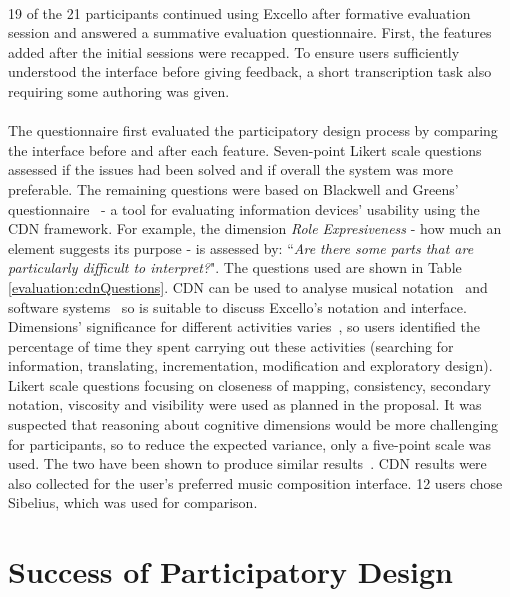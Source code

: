 \paragraph{} 19 of the 21 participants continued using Excello after formative evaluation session and answered a summative evaluation questionnaire. First, the features added after the initial sessions were recapped. To ensure users sufficiently understood the interface before giving feedback, a short transcription task also requiring some authoring was given.

\paragraph{} The questionnaire first evaluated the participatory design process by comparing the interface before and after each feature. Seven-point Likert scale questions assessed if the issues had been solved and if overall the system was more preferable. The remaining questions were based on Blackwell and Greens' questionnaire~\cite{blackwell:questionnaire} - a tool for evaluating information devices' usability using the
CDN framework. For example, the dimension \textit{Role Expresiveness} - how much an element suggests its purpose - is assessed by: ``\textit{Are there some parts that are particularly difficult to interpret?}". The questions used are shown in Table \ref{evaluation:cdnQuestions}. CDN can be used to analyse musical notation~\cite{blackwell:notation} and software systems~\cite{green:cdn} so is suitable to discuss Excello's notation and interface. Dimensions' significance for different activities varies~\cite{blackwell:tutorial}, so users identified the percentage of time they spent carrying out these activities (searching for information, translating, incrementation, modification and exploratory design). Likert scale questions focusing on closeness of mapping, consistency, secondary notation, viscosity and visibility were used as planned in the proposal. It was suspected that reasoning about cognitive dimensions would be more challenging for participants, so to reduce the expected variance, only a five-point scale was used. The two have been shown to produce similar results~\cite{dawes:points}. CDN results were also collected for the user's preferred music composition interface. 12 users chose Sibelius, which was used for comparison.

\section{Success of Participatory Design}

